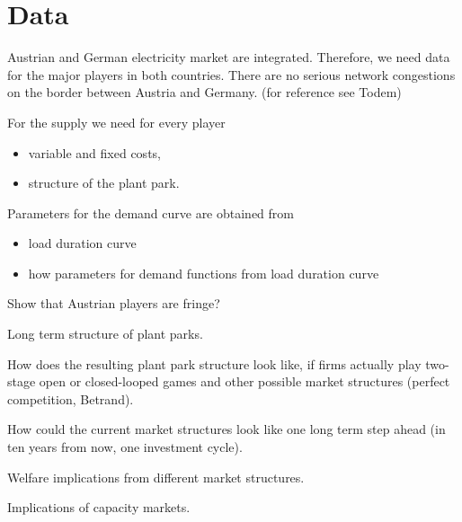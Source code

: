 \section{Data}

Austrian and German electricity market are integrated. Therefore, we need data for the major players in both countries. There are no serious network congestions on the border between Austria and Germany. (for reference see Todem)

For the supply we need for every player

\begin{itemize}
\item variable and fixed costs,
\item structure of the plant park.
\end{itemize}

Parameters for the demand curve are obtained from

\begin{itemize}
\item load duration curve
\item how parameters for demand functions from load duration curve
\end{itemize}

Show that Austrian players are fringe? 

Long term structure of plant parks.

How does the resulting plant park structure look like, if firms actually play two-stage open or closed-looped games and other possible market structures (perfect competition, Betrand). 

How could the current market structures look like one long term step ahead (in ten years from now, one investment cycle).

Welfare implications from different market structures.

Implications of capacity markets.

